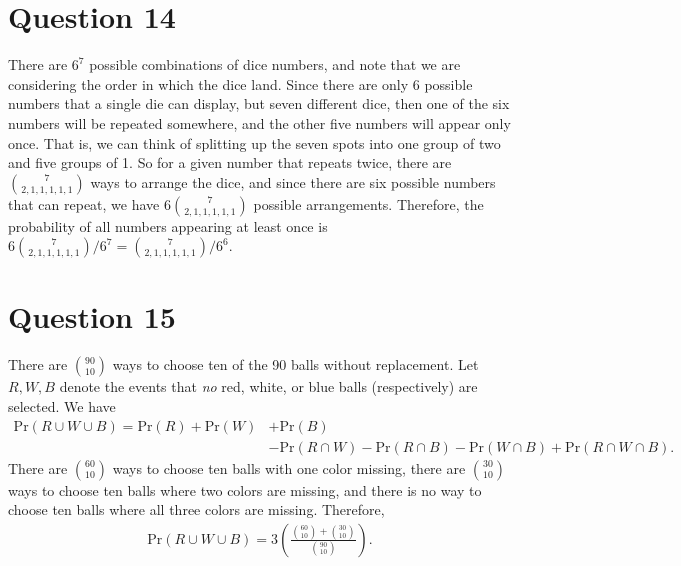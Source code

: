 \documentclass[10pt]{article}
\begin{document}
\section{Question 14} \noindent
There are \(6^7\) possible combinations of dice numbers, and note that we are considering the order in which the dice land. 
Since there are only 6 possible numbers that a single die can display, but seven different dice, then one of the six numbers 
will be repeated somewhere, and the other five numbers will appear only once. That is, we can think of splitting up the seven spots into one group of two and
five groups of 1. So for a given number that repeats twice, there are \(\binom{7}{2,1,1,1,1,1}\) ways to arrange the dice, and since there are six possible 
numbers that can repeat, we have \(6\binom{7}{2,1,1,1,1,1}\) possible arrangements. Therefore, the probability of all numbers appearing 
at least once is \(6\binom{7}{2,1,1,1,1,1} / 6^7 = \binom{7}{2,1,1,1,1,1} / 6^6\).

\section{Question 15} \noindent
There are \(\binom{90}{10}\) ways to choose ten of the 90 balls without replacement. Let \(R, W, B\) denote the events that \textit{no} red, white, or blue
balls (respectively) are selected. We have 
\begin{align*}
    \mathrm{Pr}(R \cup W \cup B) = \mathrm{Pr}(R) + \mathrm{Pr}(W) &+ \mathrm{Pr}(B) \\
    &- \mathrm{Pr}(R \cap W) - \mathrm{Pr}(R \cap B) - \mathrm{Pr}(W \cap B) 
    + \mathrm{Pr}(R \cap W \cap B). 
\end{align*}
There are \(\binom{60}{10}\) ways to choose ten balls with one color missing, there are \(\binom{30}{10}\) ways to choose ten balls where two colors are
missing, and there is no way to choose ten balls where all three colors are missing. Therefore, 
\begin{align*}
    \mathrm{Pr}(R \cup W \cup B) = 3 \left( \frac{\binom{60}{10} + \binom{30}{10}}{\binom{90}{10}} \right).
\end{align*}

\end{document}
